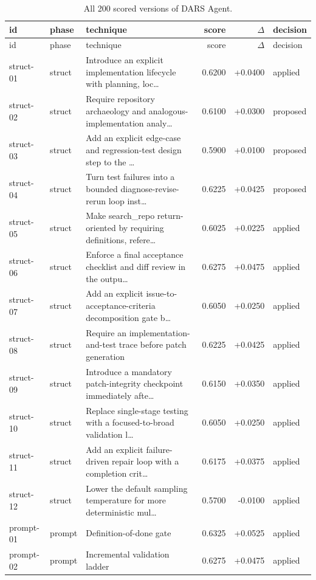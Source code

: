 \begin{center}\scriptsize\begin{longtable}{llp{5.2cm}rrl}
\caption{All 200 scored versions of DARS Agent.}\\
\toprule id & phase & technique & score & $\Delta$ & decision \\ \midrule \endfirsthead
\toprule id & phase & technique & score & $\Delta$ & decision \\ \midrule \endhead
struct-01 & struct & Introduce an explicit implementation lifecycle with planning, loc\ldots{} & 0.6200 & +0.0400 & applied \\
struct-02 & struct & Require repository archaeology and analogous-implementation analy\ldots{} & 0.6100 & +0.0300 & proposed \\
struct-03 & struct & Add an explicit edge-case and regression-test design step to the \ldots{} & 0.5900 & +0.0100 & proposed \\
struct-04 & struct & Turn test failures into a bounded diagnose-revise-rerun loop inst\ldots{} & 0.6225 & +0.0425 & proposed \\
struct-05 & struct & Make search\_repo return-oriented by requiring definitions, refere\ldots{} & 0.6025 & +0.0225 & applied \\
struct-06 & struct & Enforce a final acceptance checklist and diff review in the outpu\ldots{} & 0.6275 & +0.0475 & applied \\
struct-07 & struct & Add an explicit issue-to-acceptance-criteria decomposition gate b\ldots{} & 0.6050 & +0.0250 & applied \\
struct-08 & struct & Require an implementation-and-test trace before patch generation & 0.6225 & +0.0425 & applied \\
struct-09 & struct & Introduce a mandatory patch-integrity checkpoint immediately afte\ldots{} & 0.6150 & +0.0350 & applied \\
struct-10 & struct & Replace single-stage testing with a focused-to-broad validation l\ldots{} & 0.6050 & +0.0250 & applied \\
struct-11 & struct & Add an explicit failure-driven repair loop with a completion crit\ldots{} & 0.6175 & +0.0375 & applied \\
struct-12 & struct & Lower the default sampling temperature for more deterministic mul\ldots{} & 0.5700 & -0.0100 & applied \\
prompt-01 & prompt & Definition-of-done gate & 0.6325 & +0.0525 & applied \\
prompt-02 & prompt & Incremental validation ladder & 0.6275 & +0.0475 & applied \\

\end{longtable}
\end{center}
